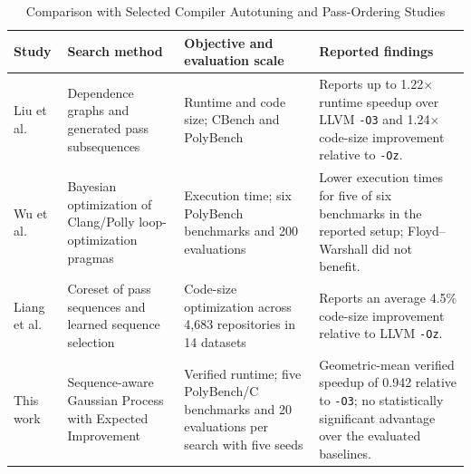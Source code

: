 \begin{table}[t]
\caption{Comparison with Selected Compiler Autotuning and Pass-Ordering Studies}
\label{tab:comparison}
\centering\small
\begin{tabularx}{\textwidth}{@{}l>{\raggedright\arraybackslash}p{3.4cm}>{\raggedright\arraybackslash}p{4.4cm}X@{}}
\toprule
Study & Search method & Objective and evaluation scale & Reported findings\\
\midrule
Liu et al.\ \cite{liu2024dco} & Dependence graphs and generated pass subsequences & Runtime and code size; CBench and PolyBench & Reports up to 1.22$\times$ runtime speedup over LLVM \texttt{-O3} and 1.24$\times$ code-size improvement relative to \texttt{-Oz}.\\
Wu et al.\ \cite{wu2022bayesian} & Bayesian optimization of Clang/Polly loop-optimization pragmas & Execution time; six PolyBench benchmarks and 200 evaluations & Lower execution times for five of six benchmarks in the reported setup; Floyd--Warshall did not benefit.\\
Liang et al.\ \cite{liang2023coreset} & Coreset of pass sequences and learned sequence selection & Code-size optimization across 4,683 repositories in 14 datasets & Reports an average 4.5\% code-size improvement relative to LLVM \texttt{-Oz}.\\
This work & Sequence-aware Gaussian Process with Expected Improvement & Verified runtime; five PolyBench/C benchmarks and 20 evaluations per search with five seeds & Geometric-mean verified speedup of 0.942 relative to \texttt{-O3}; no statistically significant advantage over the evaluated baselines.\\
\bottomrule
\end{tabularx}
\end{table}
